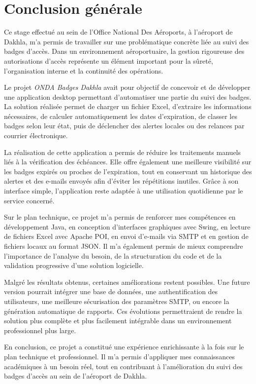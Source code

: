 \documentclass[12pt,a4paper,openany]{report}
\begin{document}
\chapter*{Conclusion générale}

Ce stage effectué au sein de l'Office National Des Aéroports, à l'aéroport de
Dakhla, m'a permis de travailler sur une problématique concrète liée au suivi des
badges d'accès. Dans un environnement aéroportuaire, la gestion rigoureuse des
autorisations d'accès représente un élément important pour la sûreté, l'organisation
interne et la continuité des opérations.

Le projet \textit{ONDA Badges Dakhla} avait pour objectif de concevoir et de
développer une application desktop permettant d'automatiser une partie du suivi
des badges. La solution réalisée permet de charger un fichier Excel, d'extraire
les informations nécessaires, de calculer automatiquement les dates d'expiration,
de classer les badges selon leur état, puis de déclencher des alertes locales ou
des relances par courrier électronique.

La réalisation de cette application a permis de réduire les traitements manuels
liés à la vérification des échéances. Elle offre également une meilleure visibilité
sur les badges expirés ou proches de l'expiration, tout en conservant un historique
des alertes et des e-mails envoyés afin d'éviter les répétitions inutiles. Grâce à
son interface simple, l'application reste adaptée à une utilisation quotidienne par
le service concerné.

Sur le plan technique, ce projet m'a permis de renforcer mes compétences en
développement Java, en conception d'interfaces graphiques avec Swing, en lecture
de fichiers Excel avec Apache POI, en envoi d'e-mails via SMTP et en gestion de
fichiers locaux au format JSON. Il m'a également permis de mieux comprendre
l'importance de l'analyse du besoin, de la structuration du code et de la
validation progressive d'une solution logicielle.

Malgré les résultats obtenus, certaines améliorations restent possibles. Une
future version pourrait intégrer une base de données, une authentification des
utilisateurs, une meilleure sécurisation des paramètres SMTP, ou encore la
génération automatique de rapports. Ces évolutions permettraient de rendre la
solution plus complète et plus facilement intégrable dans un environnement
professionnel plus large.

En conclusion, ce projet a constitué une expérience enrichissante à la fois sur
le plan technique et professionnel. Il m'a permis d'appliquer mes connaissances
académiques à un besoin réel, tout en contribuant à l'amélioration du suivi des
badges d'accès au sein de l'aéroport de Dakhla.
\end{document}
